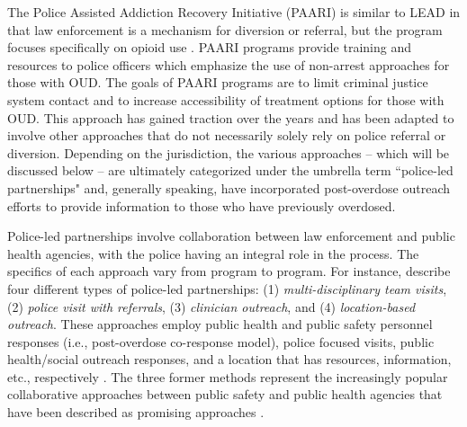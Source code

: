 The Police Assisted Addiction Recovery Initiative (PAARI) is similar to LEAD in that law enforcement is a mechanism for diversion or referral, but the program focuses specifically on opioid use \parencite{goodison_law_2019}. PAARI programs provide training and resources to police officers which emphasize the use of non-arrest approaches for those with OUD. The goals of PAARI programs are to limit criminal justice system contact and to increase accessibility of treatment options for those with OUD. This approach has gained traction over the years and has been adapted to involve other approaches that do not necessarily solely rely on police referral or diversion. Depending on the jurisdiction, the various approaches -- which will be discussed below -- are ultimately categorized under the umbrella term ``police-led partnerships" and, generally speaking, have incorporated post-overdose outreach efforts to provide information to those who have previously overdosed.

Police-led partnerships involve collaboration between law enforcement and public health agencies, with the police having an integral role in the process. The specifics of each approach vary from program to program. For instance, \textcite{formica_post_2018} describe four different types of police-led partnerships: (1) \textit{multi-disciplinary team visits}, (2) \textit{police visit with referrals}, (3) \textit{clinician outreach}, and (4) \textit{location-based outreach}. These approaches employ public health and public safety personnel responses (i.e., post-overdose co-response model), police focused visits, public health/social outreach responses, and a location that has resources, information, etc., respectively \parencite{formica_post_2018}. The three former methods represent the increasingly popular collaborative approaches between public safety and public health agencies that have been described as promising approaches \parencite{yatsco_developing_2020}. 

